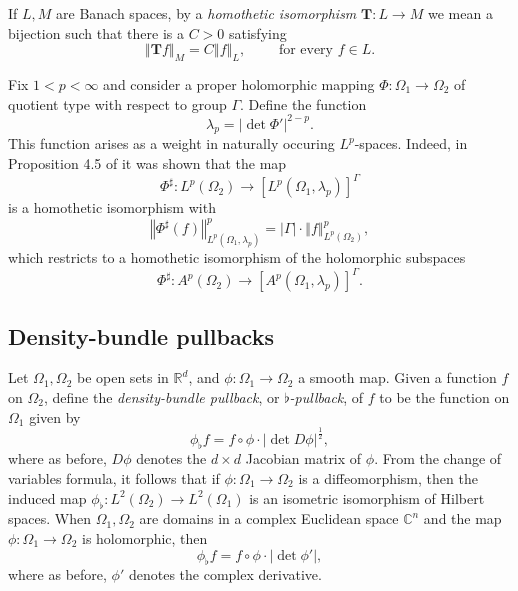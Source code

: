 \documentclass[letterpaper,11pt,reqno]{amsart}
\theoremstyle{plain}
\theoremstyle{definition}
\theoremstyle{remark}
\theoremstyle{remark}
\numberwithin{equation}{section}
\newcommand{\abs}[1]{\left\vert#1\right\vert}
\newcommand{\norm}[1]{\left\Vert#1\right\Vert}
\newcommand{\cx}{{\mathbb C}}
\newcommand{\R}{{\mathbb R}}
\begin{document}
If $L, M$ are Banach spaces, by a {\em homothetic isomorphism} ${\bm{T}}:L\to M$ we mean a bijection such that there is a  $C>0$ satisfying
\begin{equation}\label{D:homothetic-isom}
\norm{{\bm{T}} f}_M = C \norm{f}_L, \qquad \text{ for every } f \in L.
\end{equation}

Fix $1<p<\infty$ and consider a proper holomorphic mapping $\Phi:\Omega_1 \to \Omega_2$ of quotient type with respect to group $\Gamma$. 
Define the function
\begin{equation}\label{D:weight-lambda_p}
    \lambda_p  = |\det \Phi'|^{2-p}.
\end{equation}
This function arises as a weight in naturally occuring $L^p$-spaces. 
Indeed, in Proposition 4.5 of \cite{bcem} it was shown that the map 
\begin{equation}\label{E:Phi-sharp-homothetic-isomorphism}
    \Phi^\sharp:L^p(\Omega_2) \to [L^p(\Omega_1, \lambda_p)]^\Gamma
\end{equation}
is a homothetic isomorphism with 
\begin{equation}\label{E:homothetic-scaling}
\norm{\Phi^\sharp(f)}^p_{L^p(\Omega_1,\lambda_p)} = \abs{\Gamma}\cdot\norm{f}^p_{L^p(\Omega_2)},
\end{equation}
which restricts to a homothetic isomorphism of the holomorphic subspaces
\begin{equation}\label{E:Phi-sharp-holomorphic-homothetic-isomorphism}
    \Phi^\sharp:A^p(\Omega_2) \to [A^p(\Omega_1, \lambda_p)]^\Gamma.
\end{equation}

\subsection{Density-bundle pullbacks}\label{SS:Density-bundle-pullbacks}
Let $\Omega_1, \Omega_2$ be open sets in $\R^d$, and $\phi:\Omega_1\to \Omega_2$ a smooth map. 
Given a function $f$ on $\Omega_2$, define the {\em density-bundle pullback}, or {\em $\flat$-pullback}, of $f$ to be the function on $\Omega_1$ given by
\begin{equation}\label{eq-flatdef}
\phi_\flat f = f\circ \phi \cdot \abs{\det D\phi}^\frac{1}{2},
\end{equation}
where as before, $D\phi$ denotes the $d\times d$ Jacobian matrix of $\phi$.
From the change of variables formula, it follows that if $\phi:\Omega_1\to \Omega_2$ is a diffeomorphism, then the induced map $\phi_\flat:L^2(\Omega_2)\to L^2(\Omega_1)$ is an isometric isomorphism of Hilbert spaces. 
When $\Omega_1, \Omega_2$ are domains in a complex Euclidean space $\cx^n$ and the map $\phi:\Omega_1\to \Omega_2$ is holomorphic, then 
\begin{equation}\label{eq-flat}
\phi_\flat f = f\circ \phi \cdot \abs{\det \phi'},
\end{equation}
where as before, $\phi'$ denotes the complex derivative. 
\end{document}
